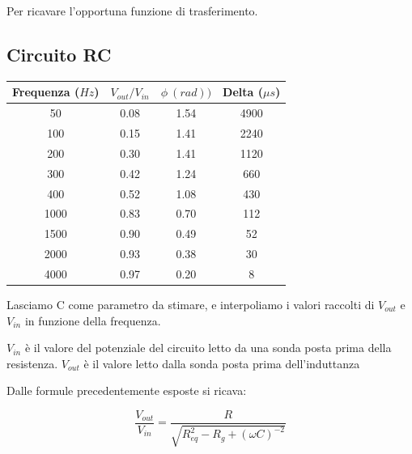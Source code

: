 Per ricavare l'opportuna funzione di trasferimento.

\subsection*{Circuito RC}


\begin{center}

\begin{tabular}{*{4}{c}}
Frequenza ($Hz$) & $V_{out}/V_{in}$ & $\phi\ (rad))$ & Delta ($\mu s$)\\
\midrule
50 & 0.08 & 1.54 & 4900\\
100 & 0.15 & 1.41 & 2240\\
200 & 0.30 & 1.41 & 1120\\
300 & 0.42 & 1.24 & 660\\
400 & 0.52 & 1.08 & 430\\
1000 & 0.83 & 0.70 & 112\\
1500 & 0.90 & 0.49 & 52\\
2000 & 0.93 & 0.38 & 30\\
4000 & 0.97 & 0.20 & 8\\

\end{tabular}
\end{center}

Lasciamo C come parametro da stimare, e interpoliamo i valori raccolti di $V_{out}$ e $V_{in}$ in funzione della frequenza.

$V_{in}$ è il valore del potenziale del circuito letto da una sonda posta prima della resistenza.
$V_{out}$ è il valore letto dalla sonda posta prima dell'induttanza 

Dalle formule precedentemente esposte si ricava:

$$\frac{V_{out}}{V_{in}} = \frac{R}{\sqrt{R_{eq}^2 - R_g +(\omega C)^{-2}}}$$


